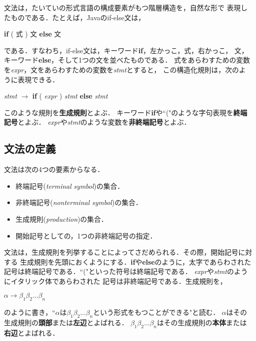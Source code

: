 \documentclass{jarticle}
\begin{document}
文法は，たいていの形式言語の構成要素がもつ階層構造を，自然な形で
表現したものである．たとえば，Javaのif-else文は，
\begin{center}
{\bf if} ( 式 ) 文 {\bf else} 文
\end{center}
である．すなわち，if-else文は，キーワード{\bf if}，左かっこ，式，右かっこ，
文，キーワード{\bf else}，そして1つの文を並べたものである．
式をあらわすための変数を{\it expr}，文をあらわすための変数を{\it stmt}とすると，
この構造化規則は，次のように表現できる．
\begin{center}
{\it stmt} $\longrightarrow$ {\bf if} ( {\it expr} ) {\it stmt} {\bf else} {\it stmt}
\end{center}
このような規則を{\bf 生成規則}とよぶ．
キーワード{\bf if}や``("のような字句表現を{\bf 終端記号}とよぶ．
{\it expr}や{\it stmt}のような変数を{\bf 非終端記号}とよぶ．

\subsection{文法の定義}

文法は次の4つの要素からなる．
\begin{itemize}
\item 終端記号({\it terminal symbol})の集合．
\item 非終端記号({\it nonterminal symbol})の集合．
\item 生成規則({\it production})の集合．
\item 開始記号としての，1つの非終端記号の指定．
\end{itemize}
文法は，生成規則を列挙することによってさだめられる．その際，開始記号に対する
生成規則を先頭におくようにする．{\bf if}や{\bf else}のように，太字であらわされた
記号は終端記号である．``("といった符号は終端記号である．
{\it expr}や{\it stmt}のようにイタリック体であらわされた
記号は非終端記号である．生成規則を，
\begin{center}
$\alpha \longrightarrow \beta_1 \beta_2 \ldots \beta_n$
\end{center}
のように書き，``$\alpha$は$\beta_1 \beta_2 \ldots \beta_n$という形式をもつことができる"と読む．
$\alpha$はその生成規則の{\bf 頭部}または{\bf 左辺}とよばれる．
$\beta_1 \beta_2 \ldots \beta_n$はその生成規則の{\bf 本体}または{\bf 右辺}とよばれる．
\end{document}
